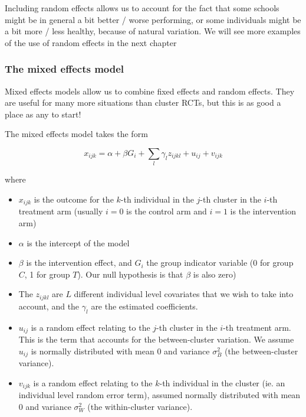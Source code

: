 \documentclass[
  openany]{book}
\providecommand{\tightlist}{%
  \setlength{\itemsep}{0pt}\setlength{\parskip}{0pt}}
\theoremstyle{definition}
\theoremstyle{definition}
\theoremstyle{definition}
\theoremstyle{definition}
\theoremstyle{remark}
\begin{document}
Including random effects allows us to account for the fact that some schools might be in general a bit better / worse performing, or some individuals might be a bit more / less healthy, because of natural variation. We will see more examples of the use of random effects in the next chapter

\subsubsection*{The mixed effects model}\label{the-mixed-effects-model}

Mixed effects models allow us to combine fixed effects and random effects. They are useful for many more situations than cluster RCTs, but this is as good a place as any to start!

The mixed effects model takes the form

\begin{equation}
x_{ijk} = \alpha + \beta G_i + \sum\limits_l \gamma_l z_{ijkl} + u_{ij} + v_{ijk}
\label{eq:remodel}
\end{equation}

where

\begin{itemize}
\tightlist
\item
  \(x_{ijk}\) is the outcome for the \(k\)-th individual in the \(j\)-th cluster in the \(i\)-th treatment arm (usually \(i=0\) is the control arm and \(i=1\) is the intervention arm)
\item
  \(\alpha\) is the intercept of the model
\item
  \(\beta\) is the intervention effect, and \(G_i\) the group indicator variable (0 for group \(C\), 1 for group \(T\)). Our null hypothesis is that \(\beta\) is also zero)
\item
  The \(z_{ijkl}\) are \(L\) different individual level covariates that we wish to take into account, and the \(\gamma_l\) are the estimated coefficients.
\item
  \(u_{ij}\) is a random effect relating to the \(j\)-th cluster in the \(i\)-th treatment arm. This is the term that accounts for the between-cluster variation. We assume \(u_{ij}\) is normally distributed with mean 0 and variance \(\sigma^2_B\) (the between-cluster variance).
\item
  \(v_{ijk}\) is a random effect relating to the \(k\)-th individual in the cluster (ie. an individual level random error term), assumed normally distributed with mean 0 and variance \(\sigma^2_W\) (the within-cluster variance).
\end{itemize}
\end{document}
